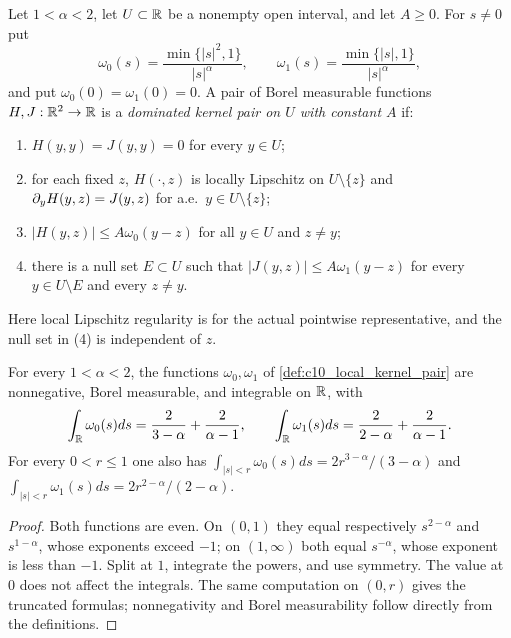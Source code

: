 \begin{definition}
  \label{def:c10_local_kernel_pair}
  Let $1<\alpha<2$, let $U\subset\mathbb{R}$ be a nonempty open interval, and let $A\ge0$.
  For $s\ne0$ put
  \[
    \omega_0(s)=\frac{\min\{|s|^2,1\}}{|s|^\alpha},\qquad
    \omega_1(s)=\frac{\min\{|s|,1\}}{|s|^\alpha},
  \]
  and put $\omega_0(0)=\omega_1(0)=0$. A pair of Borel measurable functions
  $H,J:\mathbb{R}^2\to\mathbb{R}$ is a \emph{dominated kernel pair on $U$ with constant $A$} if:
  \begin{enumerate}
    \item $H(y,y)=J(y,y)=0$ for every $y\in U$;
    \item for each fixed $z$, $H(\cdot,z)$ is locally Lipschitz on $U\setminus\{z\}$ and
      $\partial_y H(y,z)=J(y,z)$ for a.e.\ $y\in U\setminus\{z\}$;
    \item $|H(y,z)|\le A\omega_0(y-z)$ for all $y\in U$ and $z\ne y$;
    \item there is a null set $E\subset U$ such that
      $|J(y,z)|\le A\omega_1(y-z)$ for every $y\in U\setminus E$ and every $z\ne y$.
  \end{enumerate}
  Here local Lipschitz regularity is for the actual pointwise representative, and the null set
  in (4) is independent of $z$.
\end{definition}

\begin{lemma}
  \label{lem:c10_kernel_envelopes}
  For every $1<\alpha<2$, the functions $\omega_0,\omega_1$ of
  \cref{def:c10_local_kernel_pair} are nonnegative, Borel measurable, and integrable on $\mathbb{R}$,
  with
  \[
    \int_{\mathbb{R}}\omega_0(s)ds=\frac2{3-\alpha}+\frac2{\alpha-1},\qquad
    \int_{\mathbb{R}}\omega_1(s)ds=\frac2{2-\alpha}+\frac2{\alpha-1}.
  \]
  For every $0<r\le1$ one also has
  $\int_{|s|<r}\omega_0(s)ds=2r^{3-\alpha}/(3-\alpha)$ and
  $\int_{|s|<r}\omega_1(s)ds=2r^{2-\alpha}/(2-\alpha)$.
\end{lemma}
\begin{proof}
  Both functions are even. On $(0,1)$ they equal respectively $s^{2-\alpha}$ and
  $s^{1-\alpha}$, whose exponents exceed $-1$; on $(1,\infty)$ both equal $s^{-\alpha}$,
  whose exponent is less than $-1$. Split at $1$, integrate the powers, and use symmetry.
  The value at $0$ does not affect the integrals. The same computation on $(0,r)$ gives the
  truncated formulas; nonnegativity and Borel measurability follow directly from the definitions.
\end{proof}

